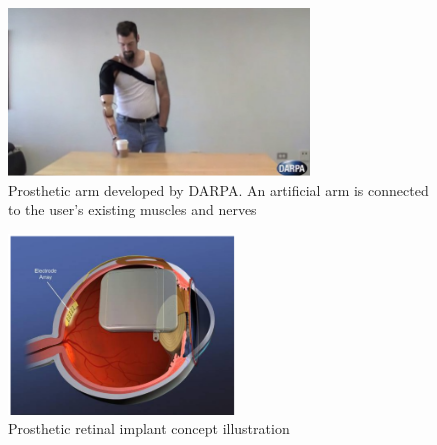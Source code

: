 \begin{figure}[]
	\centering
		\includegraphics[width = 8cm]{prothesis_arm}
	\caption{Prosthetic arm developed by DARPA. An artificial arm is connected to the user's existing muscles and nerves\cite{prosthetic_arm}}
	\label{prosthetic_arm}
\end{figure}

\begin{figure}[]
	\centering
	\includegraphics[width = 6cm]{prothesis_eye}
	\caption{Prosthetic retinal implant concept illustration \cite{retinal_implant}}
	\label{prosthetic_eye}
\end{figure}